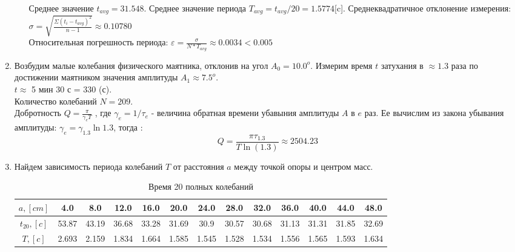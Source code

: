 \documentclass[12pt]{article}
\begin{document}
\begin{enumerate}
\begin{enumerate}
            Среднее значение $t_{avg} = 31.548$. Среднее значение периода $T_{avg} = t_{avg}/20 = 1.5774$[c].
            Среднеквадратичное отклонение измерения:
            $\sigma = \sqrt{\frac{\Sigma (t_i - t_{avg})^2 }{n-1}} \approx 0.10780$ \\
            Относительная погрешность периода: $\varepsilon = \frac{\sigma}{N* T_{avg}} \approx 0.0034 < 0.005$ \\  
        \end{enumerate}
        \item Возбудим малые колебания физического маятника, отклонив на угол $A_0 = 10.0^o$. Измерим время $t$ затухания в $\approx 1.3$ раза по достижении маятником значения амплитуды $A_1 \approx 7.5^o$. \\
        $t \approx$ 5 мин 30 с = 330 (с). \\
        Количество колебаний $N = 209$.\\
        Добротность $Q = \frac{\pi}{\gamma_{e}T}$ , где $\gamma_{e} = 1 / \tau_{e}$ - величина обратная времени убавыния амплитуды $A$ в $e$ раз. Ее вычислим из закона убывания амплитуды: $\gamma_{e} = \gamma_{1.3} \ln{1.3}$, тогда :\\
        \begin{equation}
            Q = \frac{\pi \tau_{1.3}}{T \ln(1.3)} \approx 2504.23
        \end{equation}
        \item Найдем зависимость периода колебаний $T$ от расстояния $a$ между точкой опоры и центром масс.
        \begin{table}[h]
                    \caption{Время 20 полных колебаний}
                    \begin{center}
                    \begin{tabular}{|c|c|c|c|c|c|c|c|c|c|c|c|c|}
                            \hline 
                                $a,[cm]$ & 4.0& 8.0& 12.0& 16.0& 20.0& 24.0& 28.0& 32.0& 36.0& 40.0& 44.0& 48.0 \\

                            \hline
                                $t_{20},[c]$ & 53.87& 43.19& 36.68& 33.28& 31.69& 30.9& 30.57& 30.68& 31.13& 31.31& 31.85& 32.69 \\
                            \hline
                                $T,[c]$ & 2.693& 2.159& 1.834& 1.664& 1.585& 1.545& 1.528& 1.534& 1.556& 1.565& 1.593& 1.634\\
                            \hline
                            \end{tabular}
                        \end{center}
            \end{table}

    \end{enumerate}
\end{document}
